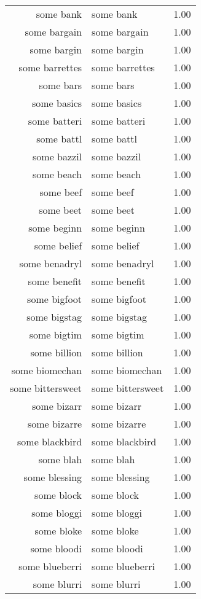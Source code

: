 \begin{table}[ht]
\begin{tabular}{rlr}
  some bank & some bank & 1.00 \\ 
  some bargain & some bargain & 1.00 \\ 
  some bargin & some bargin & 1.00 \\ 
  some barrettes & some barrettes & 1.00 \\ 
  some bars & some bars & 1.00 \\ 
  some basics & some basics & 1.00 \\ 
  some batteri & some batteri & 1.00 \\ 
  some battl & some battl & 1.00 \\ 
  some bazzil & some bazzil & 1.00 \\ 
  some beach & some beach & 1.00 \\ 
  some beef & some beef & 1.00 \\ 
  some beet & some beet & 1.00 \\ 
  some beginn & some beginn & 1.00 \\ 
  some belief & some belief & 1.00 \\ 
  some benadryl & some benadryl & 1.00 \\ 
  some benefit & some benefit & 1.00 \\ 
  some bigfoot & some bigfoot & 1.00 \\ 
  some bigstag & some bigstag & 1.00 \\ 
  some bigtim & some bigtim & 1.00 \\ 
  some billion & some billion & 1.00 \\ 
  some biomechan & some biomechan & 1.00 \\ 
  some bittersweet & some bittersweet & 1.00 \\ 
  some bizarr & some bizarr & 1.00 \\ 
  some bizarre & some bizarre & 1.00 \\ 
  some blackbird & some blackbird & 1.00 \\ 
  some blah & some blah & 1.00 \\ 
  some blessing & some blessing & 1.00 \\ 
  some block & some block & 1.00 \\ 
  some bloggi & some bloggi & 1.00 \\ 
  some bloke & some bloke & 1.00 \\ 
  some bloodi & some bloodi & 1.00 \\ 
  some blueberri & some blueberri & 1.00 \\ 
  some blurri & some blurri & 1.00 \\ 

\end{tabular}
\end{table}
